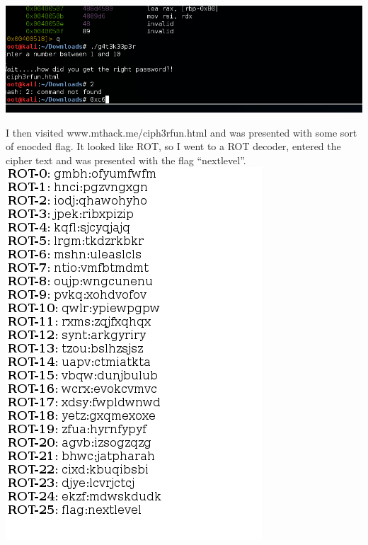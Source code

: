 \documentclass[12pt]{report}
\begin{document}
\includegraphics[scale=0.33, width=\linewidth]{ciph3rfunhtml.PNG}

I then visited www.mthack.me/ciph3rfun.html and was presented with some sort of enocded flag. It looked like ROT, so I went to a ROT decoder, entered the cipher text and was presented with the flag ``nextlevel''.\\
\includegraphics[scale=0.33, width=\linewidth]{nextlevel.PNG}
\newline
\end{document}
